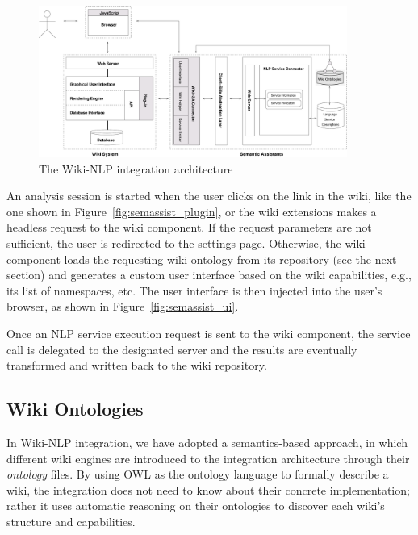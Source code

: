 \begin{figure}
\centering
\includegraphics[width=0.9\textwidth]{pictures/wikinlp_arch}
\caption{The Wiki-NLP integration architecture}
\label{fig:wikinlp_arch}
\end{figure}

An analysis session is started when the user clicks on the \sa link in the wiki, like the one shown in Figure~\ref{fig:semassist_plugin}, or the wiki extensions makes a headless request to the wiki component. If the request parameters are not sufficient, the user is redirected to the settings page. Otherwise, the wiki component loads the requesting wiki ontology from its repository (see the next section) and generates a custom user interface based on the wiki capabilities, e.g., its list of namespaces, etc. The user interface is then injected into the user's browser, as shown in Figure~\ref{fig:semassist_ui}.

Once an NLP service execution request is sent to the wiki component, the service call is delegated to the designated \sa server and the results are eventually transformed and written back to the wiki repository.

\subsection{Wiki Ontologies}
In Wiki-NLP integration, we have adopted a semantics-based approach, in which different wiki engines are introduced to the integration architecture through their \emph{ontology} files. By using OWL as the ontology language to formally describe a wiki, the integration does not need to know about their concrete implementation; rather it uses automatic reasoning on their ontologies to discover each wiki's structure and capabilities.

